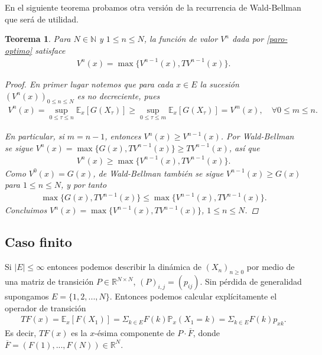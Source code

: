 \documentclass{article}
\newtheorem{teorema}[theorem]{Teorema}
\numberwithin{equation}{section}
\begin{document}
En el siguiente teorema probamos otra versión de la recurrencia de Wald-Bellman que será de utilidad.

\begin{teorema}\label{camargo}
    Para $N\in \mathbb{N}$ y $1\leq n\leq N$, la función de valor $V^n$ dada por \eqref{paro-optimo} satisface
    \begin{align}
        V^n(x) = \max\{V^{n-1}(x), TV^{n-1}(x)\}.
    \end{align}

    \begin{proof}
        En primer lugar notemos que para cada $x \in E$ la sucesión $(V^n(x))_{0\leq n\leq N}$ es no decreciente, pues
        \begin{align}
            V^n(x) = \sup_{0\leq \tau\leq n}\mathbb{E}_x\left[G(X_\tau)\right] \geq \sup_{0\leq \tau \leq m}\mathbb{E}_x\left[G(X_\tau)\right] = V^m(x), \quad \forall 0\leq m \leq n.
        \end{align}

        En particular, si $m=n-1$, entonces $V^n(x)\geq V^{n-1}(x)$. Por Wald-Bellman se sigue $V^n(x) = \max\{G(x),TV^{n-1}(x)\} \geq TV^{n-1}(x)$, así que
        \begin{align*}
        V^n(x) \geq \max\{V^{n-1}(x),TV^{n-1}(x)\}.
        \end{align*}
        Como $V^0(x) = G(x)$, de Wald-Bellman también se sigue $V^{n-1}(x)\geq G(x)$ para $1\leq n \leq N$, y por tanto 
        \begin{align*}
        \max\{G(x),TV^{n-1}(x)\}\leq \max\{V^{n-1}(x),TV^{n-1}(x)\}.
        \end{align*}
        Concluimos $V^n(x) = \max\{V^{n-1}(x),TV^{n-1}(x)\}$, $1\leq n \leq N$.
    \end{proof}
\end{teorema}

\subsection{Caso finito}

Si $|E|\leq \infty$ entonces podemos describir la dinámica de $(X_n)_{n\geq 0}$ por medio de una matriz de transición $P\in \mathbb{R}^{N\times N}$, $(P)_{i,j} = (p_{ij})$. Sin pérdida de generalidad supongamos $E = \{1,2,...,N\}$. Entonces podemos calcular explícitamente el operador de transición
\begin{align*}
    TF(x) = \mathbb{E}_x\left[F(X_1)\right] = \Sigma_{k \in E}F(k)\mathbb{P}_x(X_1 = k) = \Sigma_{k \in E}F(k)p_{xk}.
\end{align*}
Es decir, $TF(x)$ es la $x$-ésima componente de $P\cdot \overline{F}$, donde $\overline{F} = (F(1),...,F(N)) \in \mathbb{R}^N$.
\end{document}
